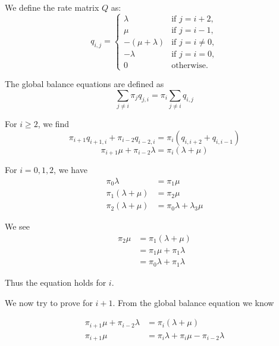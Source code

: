 \begin{solution}
  We define the rate matrix \(Q\) as:
  \[
  q_{i,j} =
  \begin{cases}
    \lambda & \text{if } j = i+2, \\
    \mu & \text{if } j = i-1, \\
    -(\mu + \lambda) & \text{if } j = i \neq 0, \\
    -\lambda & \text{if } j = i = 0, \\
    0 & \text{otherwise.}
  \end{cases}
  \]

  The global balance equations are defined as
  \[
    \sum_{j\neq i} \pi_jq_{j,i}=\pi_i\sum_{j\neq i}q_{i,j}
  \]

  For $i\geq 2$, we find
  \[
    \pi_{i+1}q_{i+1,i} + \pi_{i-2}q_{i-2,i}=\pi_i(q_{i,i+2} + q_{i,i-1})
  \]
  \[
    \pi_{i+1}\mu + \pi_{i-2}\lambda = \pi_i(\lambda + \mu)
  \]

  For $i={0,1,2}$, we have
  \begin{align*}
    \pi_0\lambda &= \pi_1\mu \\
    \pi_1(\lambda+\mu) &= \pi_2\mu\\
    \pi_2(\lambda+\mu) &= \pi_0\lambda + \lambda_3\mu
  \end{align*}

  We see
  \begin{align*}
    \pi_2\mu  &= \pi_1(\lambda+\mu) \\
              &= \pi_1\mu  + \pi_1\lambda\\
              &= \pi_0\lambda  + \pi_1\lambda
  \end{align*}

  Thus the equation holds for $i$.

  We now try to prove for $i+1$. From the global balance equation we know

  \begin{align*}
    \pi_{i+1}\mu + \pi_{i-2}\lambda &= \pi_i(\lambda + \mu) \\
    \pi_{i+1}\mu  &= \pi_i\lambda + \pi_i\mu - \pi_{i-2}\lambda
  \end{align*}


\end{solution}
